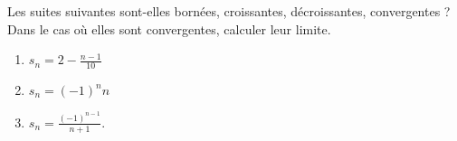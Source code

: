 

\begin{exercice}\label{exoINGE11140036}

	Les suites suivantes sont-elles bornées, croissantes, décroissantes, convergentes ? Dans le cas où elles sont convergentes, calculer leur limite.
	\begin{enumerate}

		\item
			$s_n=2-\frac{ n-1 }{ 10 }$
		\item
			$s_n=(-1)^nn$
		\item
			$s_n=\frac{ (-1)^{n-1} }{ n+1 }$.

	\end{enumerate}
	

\end{exercice}
